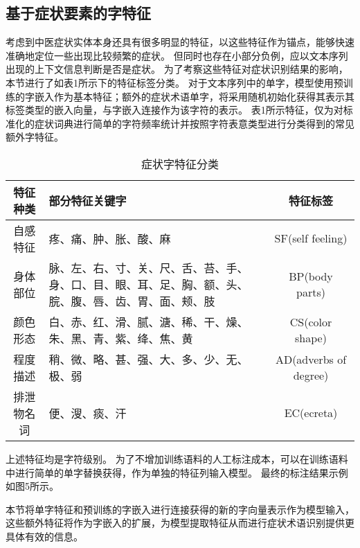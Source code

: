 \subsection{基于症状要素的字特征}
考虑到中医症状实体本身还具有很多明显的特征，以这些特征作为锚点，能够快速准确地定位一些出现比较频繁的症状。
但同时也存在小部分负例，应以文本序列出现的上下文信息判断是否是症状。
为了考察这些特征对症状识别结果的影响，本节进行了如表1所示下的特征标签分类。
对于文本序列中的单字，模型使用预训练的字嵌入作为基本特征；额外的症状术语单字，将采用随机初始化获得其表示其标签类型的嵌入向量，与字嵌入连接作为该字符的表示。
表1所示特征，仅为对标准化的症状词典进行简单的字符频率统计并按照字符表意类型进行分类得到的常见额外字特征。
\begin{table}[!htbp]
    \centering
    \footnotesize
    \setlength{\tabcolsep}{4pt}
    \renewcommand{\arraystretch}{1.2}
    \begin{tabular}{cp{7cm}c}
        \hline\hline
        特征种类 & 部分特征关键字 & 特征标签\\
        \hline
        自感特征 & 疼、痛、肿、胀、酸、麻 & SF(self feeling)\\
        \hline
        身体部位 & 脉、左、右、寸、关、尺、舌、苔、手、身、口、目、眼、耳、足、胸、额、头、脘、腹、唇、齿、胃、面、颊、肢 & BP(body parts)\\
        \hline
        颜色形态 & 白、赤、红、滑、腻、溏、稀、干、燥、朱、黑、青、紫、绛、焦、黄 & CS(color shape)\\
        \hline
        程度描述 & 稍、微、略、甚、强、大、多、少、无、极、弱 & AD(adverbs of degree) \\
        \hline
        排泄物名词 & 便、溲、痰、汗 & EC(ecreta)\\
        \hline\hline
    \end{tabular}
    \caption{症状字特征分类}
\end{table}

上述特征均是字符级别。
为了不增加训练语料的人工标注成本，可以在训练语料中进行简单的单字替换获得，作为单独的特征列输入模型。
最终的标注结果示例如图5所示。

本节将单字特征和预训练的字嵌入进行连接获得的新的字向量表示作为模型输入，这些额外特征将作为字嵌入的扩展，为模型提取特征从而进行症状术语识别提供更具体有效的信息。


